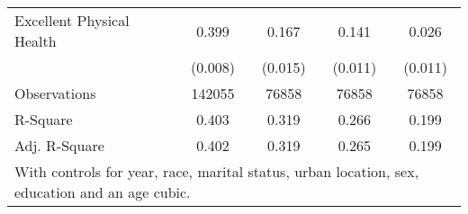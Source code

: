 \begin{table}
\begin{tabular}{l*{4}{c}}
Excellent Physical Health&       0.399\sym{***}&       0.167\sym{***}&       0.141\sym{***}&       0.026\sym{*}  \\
                    &     (0.008)         &     (0.015)         &     (0.011)         &     (0.011)         \\
\midrule
Observations        &      142055         &       76858         &       76858         &       76858         \\
R-Square            &       0.403         &       0.319         &       0.266         &       0.199         \\
Adj. R-Square       &       0.402         &       0.319         &       0.265         &       0.199         \\
\bottomrule
\multicolumn{5}{l}{\scriptsize{With controls for year, race, marital status, urban location, sex, education and an age cubic.}} \\
\end{tabular}
\end{table}
